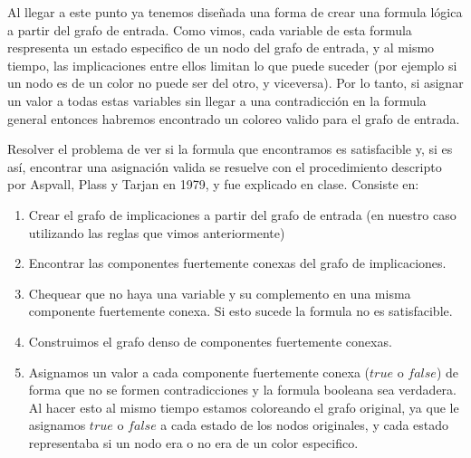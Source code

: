 \documentclass{article}
\theoremstyle{definition}
\theoremstyle{remark}
\begin{document}
Al llegar a este punto ya tenemos diseñada una forma de crear una formula lógica a partir del grafo de entrada. Como vimos, cada variable de esta formula respresenta un estado especifico de un nodo del grafo de entrada, y al mismo tiempo, las implicaciones entre ellos limitan lo que puede suceder (por ejemplo si un nodo es de un color no puede ser del otro, y viceversa).
Por lo tanto, si asignar un valor a todas estas variables sin llegar a una contradicción en la formula general entonces habremos encontrado un coloreo valido para el grafo de entrada.

Resolver el problema de ver si la formula que encontramos es satisfacible y, si es así, encontrar una asignación valida se resuelve con el procedimiento descripto por Aspvall, Plass y Tarjan en 1979, y fue explicado en clase. Consiste en:
\begin{enumerate}
\item Crear el grafo de implicaciones a partir del grafo de entrada (en nuestro caso utilizando las reglas que vimos anteriormente)
\item Encontrar las componentes fuertemente conexas del grafo de implicaciones.
\item Chequear que no haya una variable y su complemento en una misma componente fuertemente conexa. Si esto sucede la formula no es satisfacible.
\item Construimos el grafo denso de componentes fuertemente conexas.
\item Asignamos un valor a cada componente fuertemente conexa ($true$ o $false$) de forma que no se formen contradicciones y la formula booleana sea verdadera. Al hacer esto al mismo tiempo estamos coloreando el grafo original, ya que le asignamos $true$ o $false$ a cada estado de los nodos originales, y cada estado representaba si un nodo era o no era de un color especifico.
\end{enumerate}
\end{document}
